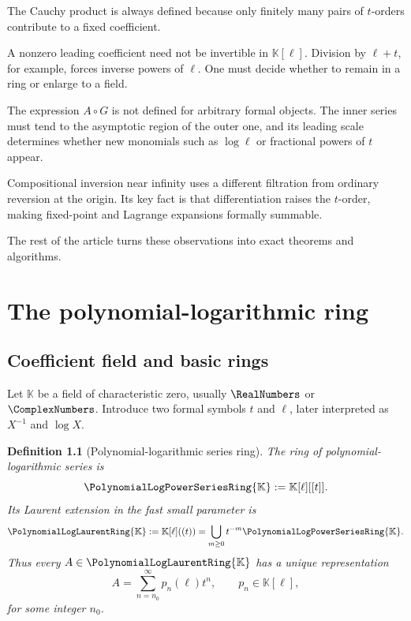 \documentclass[11pt,oneside,openany]{book}
\newtheorem{definition}[theorem]{Definition}
\newcommand{\K}{\mathbb{K}}
\newcommand{\Rring}{\PolynomialLogPowerSeriesRing{\K}}
\newcommand{\Pring}{\PolynomialLogLaurentRing{\K}}
\newcommand{\compose}{\mathbin{\circ}}
\begin{document}
\begin{description}[style=nextline]
\item[Multiplication.]
The Cauchy product is always defined because only finitely many pairs of
\(t\)-orders contribute to a fixed coefficient.

\item[Division.]
A nonzero leading coefficient need not be invertible in \(\K[\ell]\).  Division
by \(\ell+t\), for example, forces inverse powers of \(\ell\).  One must decide
whether to remain in a ring or enlarge to a field.

\item[Composition.]
The expression \(A\compose G\) is not defined for arbitrary formal objects.
The inner series must tend to the asymptotic region of the outer one, and its
leading scale determines whether new monomials such as \(\log\ell\) or
fractional powers of \(t\) appear.

\item[Series reversal.]
Compositional inversion near infinity uses a different filtration from
ordinary reversion at the origin.  Its key fact is that differentiation raises
the \(t\)-order, making fixed-point and Lagrange expansions formally summable.
\end{description}

The rest of the article turns these observations into exact theorems and
algorithms.

\chapter{The polynomial-logarithmic ring}
\label{ch:formal}

\section{Coefficient field and basic rings}
Let \(\K\) be a field of characteristic zero, usually \(\RealNumbers\) or
\(\ComplexNumbers\).  Introduce two formal symbols \(t\) and \(\ell\), later
interpreted as \(X^{-1}\) and \(\log X\).

\begin{definition}[Polynomial-logarithmic series ring]
The ring of polynomial-logarithmic series is
\begin{equation}\label{eq:Rring}
  \Rring:=\K[\ell][[t]].
\end{equation}
Its Laurent extension in the fast small parameter is
\begin{equation}\label{eq:Pring}
  \Pring:=\K[\ell]((t))
  =\bigcup_{m\geq0}t^{-m}\Rring.
\end{equation}
Thus every \(A\in\Pring\) has a unique representation
\begin{equation}\label{eq:uniqueexp}
  A=\sum_{n=n_0}^{\infty}p_n(\ell)t^n,
  \qquad p_n\in\K[\ell],
\end{equation}
for some integer \(n_0\).
\end{definition}
\end{document}
